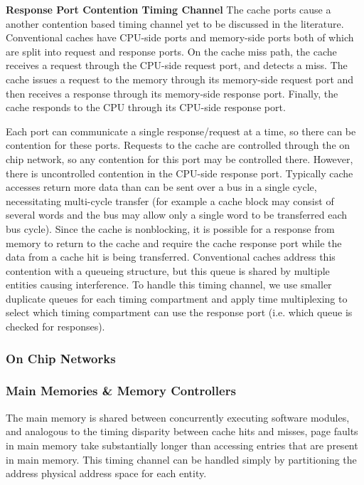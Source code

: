 \textbf{Response Port Contention Timing Channel}
The cache ports cause a another contention based timing channel yet to be 
discussed in the literature. Conventional caches have CPU-side ports and 
memory-side ports both of which are split into request and response ports. On 
the cache miss path, the cache receives a request through the CPU-side request 
port, and detects a miss. The cache issues a request to the memory through its 
memory-side request port and then receives a response through its memory-side 
response port. Finally, the cache responds to the CPU through its CPU-side 
response port.

Each port can communicate a single response/request at a time, so there can be 
contention for these ports. Requests to the cache are controlled through the on 
chip network, so any contention for this port may be controlled there. However, 
there is uncontrolled contention in the CPU-side response port. Typically cache 
accesses return more data than can be sent over a bus in a single cycle, 
necessitating multi-cycle transfer (for example a cache block may consist of 
several words and the bus may allow only a single word to be transferred each 
bus cycle). Since the cache is nonblocking, it is possible for a response from 
memory to return to the cache and require the cache response port while the 
data from a cache hit is being transferred. Conventional caches address this 
contention with a queueing structure, but this queue is shared by multiple 
entities causing interference. To handle this timing channel, we use smaller 
duplicate queues for each timing compartment and apply time multiplexing to 
select which timing compartment can use the response port (i.e. which queue is 
checked for responses).

\subsubsection{On Chip Networks}
\subsubsection{Main Memories \& Memory Controllers}
The main memory is shared between concurrently executing software modules, and 
analogous to the timing disparity between cache hits and misses, page faults in 
main memory take substantially longer than accessing entries that are present 
in main memory. This timing channel can be handled simply by partitioning the 
address physical address space for each entity.

